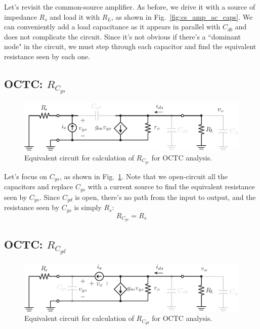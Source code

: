 Let's revisit the common-source amplifier.  As before, we drive it with a source of impedance $R_s$ and load it with $R_L$, as shown in Fig.~\ref{fig:cs_amp_ac_caps}.  We can conveniently add a load capacitance as it appears in parallel with $C_{db}$ and does not complicate the circuit. Since it's not obvious if there's a ``dominant node" in the circuit, we must step through each capacitor and find the equivalent resistance seen by each one. 
\subsection{OCTC:  $R_{C_{gs}}$}
\begin{figure}[tb]
\begin{center}
\includegraphics[scale=1]{cs_amp_ac_caps_Cgs}
\end{center}
\caption{Equivalent circuit for calculation of $R_{C_{gs}}$ for OCTC analysis.} \label{fig:cs_amp_ac_caps_Cgs}
\end{figure}

Let's focus on $C_{gs}$, as shown in Fig.~\ref{fig:cs_amp_ac_caps_Cgs}. Note that we open-circuit all the capacitors and replace $C_{gs}$ with a current source to find the equivalent resistance seen by $C_{gs}$.
 Since $C_{gd}$ is open, there's no path from the input to output, and the resistance seen by $C_{gs}$ is simply $R_s$:
\begin{equation}
	{R_{C_{gs}}} = R_{s}
\end{equation}
\subsection{OCTC:  $R_{C_{gd}}$}
\begin{figure}[tb]
\begin{center}
\includegraphics[scale=1]{cs_amp_ac_caps_Cgd}
\end{center}
\caption{Equivalent circuit for calculation of $R_{C_{gd}}$ for OCTC analysis.} \label{fig:cs_amp_ac_caps_Cgd}
\end{figure}
 
